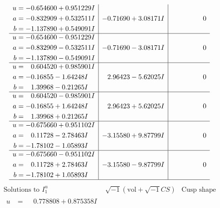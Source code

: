 \documentclass[1p]{elsarticle_modified}
\theoremstyle{definition}
\newcommand{\I}{\sqrt{-1}}
\begin{document}
$$\begin{array}{c|c|c}
\begin{aligned}
u &= -0.654600 + 0.951229 I \\
a &= -0.832909 + 0.532511 I \\
b &= -1.137890 + 0.549091 I\end{aligned}
 & -0.71690 + 3.08171 I & \phantom{-0.000000 } 0 \\ \hline\begin{aligned}
u &= -0.654600 - 0.951229 I \\
a &= -0.832909 - 0.532511 I \\
b &= -1.137890 - 0.549091 I\end{aligned}
 & -0.71690 - 3.08171 I & \phantom{-0.000000 } 0 \\ \hline\begin{aligned}
u &= \phantom{-}0.604520 + 0.985901 I \\
a &= -0.16855 - 1.64248 I \\
b &= \phantom{-}1.39968 - 0.21265 I\end{aligned}
 & \phantom{-}2.96423 - 5.62025 I & \phantom{-0.000000 } 0 \\ \hline\begin{aligned}
u &= \phantom{-}0.604520 - 0.985901 I \\
a &= -0.16855 + 1.64248 I \\
b &= \phantom{-}1.39968 + 0.21265 I\end{aligned}
 & \phantom{-}2.96423 + 5.62025 I & \phantom{-0.000000 } 0 \\ \hline\begin{aligned}
u &= -0.675660 + 0.951102 I \\
a &= \phantom{-}0.11728 - 2.78463 I \\
b &= -1.78102 - 1.05893 I\end{aligned}
 & -3.15580 + 9.87799 I & \phantom{-0.000000 } 0 \\ \hline\begin{aligned}
u &= -0.675660 - 0.951102 I \\
a &= \phantom{-}0.11728 + 2.78463 I \\
b &= -1.78102 + 1.05893 I\end{aligned}
 & -3.15580 - 9.87799 I & \phantom{-0.000000 } 0\\
 \hline 
 \end{array}$$\newpage$$\begin{array}{c|c|c}  
\text{Solutions to }I^u_{1}& \I (\text{vol} + \sqrt{-1}CS) & \text{Cusp shape}\\
 \hline 
\begin{aligned}
u &= \phantom{-}0.778808 + 0.875358 I \\

\end{aligned}
\end{array}$$
\end{document}
